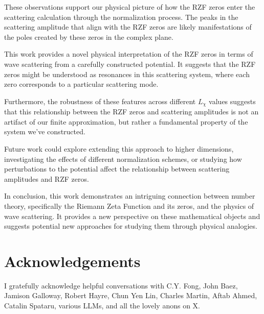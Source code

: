\documentclass[11pt, oneside]{article}
\begin{document}
These observations support our physical picture of how the RZF zeros enter the scattering calculation through the normalization process. The peaks in the scattering amplitude that align with the RZF zeros are likely manifestations of the poles created by these zeros in the complex plane.

This work provides a novel physical interpretation of the RZF zeros in terms of wave scattering from a carefully constructed potential. It suggests that the RZF zeros might be understood as resonances in this scattering system, where each zero corresponds to a particular scattering mode.

Furthermore, the robustness of these features across different $L_\chi$ values suggests that this relationship between the RZF zeros and scattering amplitudes is not an artifact of our finite approximation, but rather a fundamental property of the system we've constructed.

Future work could explore extending this approach to higher dimensions, investigating the effects of different normalization schemes, or studying how perturbations to the potential affect the relationship between scattering amplitudes and RZF zeros.

In conclusion, this work demonstrates an intriguing connection between number theory, specifically the Riemann Zeta Function and its zeros, and the physics of wave scattering. It provides a new perspective on these mathematical objects and suggests potential new approaches for studying them through physical analogies.

\section{Acknowledgements}
I gratefully acknowledge helpful conversations with C.Y. Fong, John Baez, Jamison Galloway, Robert Hayre, Chun Yen Lin, Charles Martin, Aftab Ahmed, Catalin Spataru, various LLMs, and all the lovely anons on X.

\printbibliography
\end{document}
